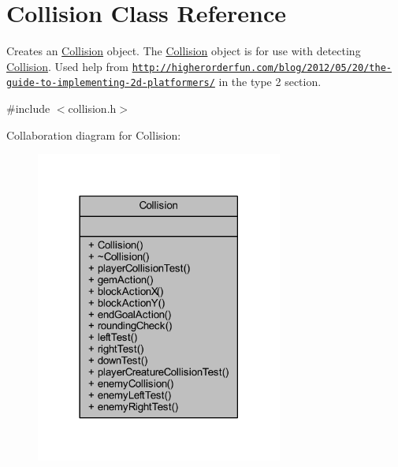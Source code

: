 \hypertarget{class_collision}{\section{Collision Class Reference}
\label{class_collision}
}


Creates an \hyperlink{class_collision}{Collision} object. The \hyperlink{class_collision}{Collision} object is for use with detecting \hyperlink{class_collision}{Collision}. Used help from \href{http://higherorderfun.com/blog/2012/05/20/the-guide-to-implementing-2d-platformers/}{\tt http\+://higherorderfun.\+com/blog/2012/05/20/the-\/guide-\/to-\/implementing-\/2d-\/platformers/} in the type 2 section.  




{\ttfamily \#include $<$collision.\+h$>$}



Collaboration diagram for Collision\+:
\nopagebreak
\begin{figure}[H]
\begin{center}
\leavevmode
\includegraphics[width=230pt]{class_collision__coll__graph}
\end{center}
\end{figure}
